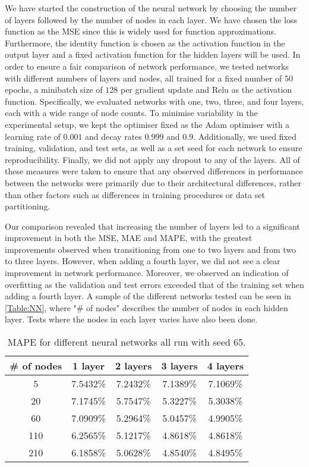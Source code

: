 We have started the construction of the neural network by choosing the number of layers followed by the number of nodes in each layer. We have chosen the loss function as the MSE since this is widely used for function approximations. Furthermore, the identity function is chosen as the activation function in the output layer and a fixed activation function for the hidden layers will be used. In order to ensure a fair comparison of network performance, we tested networks with different numbers of layers and nodes, all trained for a fixed number of $50$ epochs, a minibatch size of $128$ per gradient update and Relu as the activation function. Specifically, we evaluated networks with one, two, three, and four layers, each with a wide range of node counts. To minimise variability in the experimental setup, we kept the optimiser fixed as the Adam optimiser with a learning rate of $0.001$ and decay rates $0.999$ and $0.9$. Additionally, we used fixed training, validation, and test sets, as well as a set seed for each network to ensure reproducibility. Finally, we did not apply any dropout to any of the layers. All of these measures were taken to ensure that any observed differences in performance between the networks were primarily due to their architectural differences, rather than other factors such as differences in training procedures or data set partitioning.

Our comparison revealed that increasing the number of layers led to a significant improvement in both the MSE, MAE and MAPE, with the greatest improvements observed when transitioning from one to two layers and from two to three layers. However, when adding a fourth layer, we did not see a clear improvement in network performance. Moreover, we observed an indication of overfitting as the validation and test errors exceeded that of the training set when adding a fourth layer. A sample of the different networks tested can be seen in \autoref{Table:NN}, where "\# of nodes" describes the number of nodes in each hidden layer. Tests where the nodes in each layer varies have also been done.
\begin{table}[H]
    \centering
    {\renewcommand{\arraystretch}{1.25}\begin{tabular}{c|cccc}
        \# of nodes &  1 layer & 2 layers & 3 layers & 4 layers\\\hline
        5   & 7.5432\% & 7.2432\% & 7.1389\% & 7.1069\% \\ \hline
        20  & 7.1745\% & 5.7547\% & 5.3227\% & 5.3038\% \\ \hline
        60  & 7.0909\% & 5.2964\% & 5.0457\% & 4.9905\% \\ \hline
        110 & 6.2565\% & 5.1217\% & 4.8618\% & 4.8618\% \\ \hline
        210 & 6.1858\% & 5.0628\% & 4.8540\% & 4.8495\%
    \end{tabular}}
    \caption{MAPE for different neural networks all run with seed 65.}
    \label{Table:NN}
\end{table}

